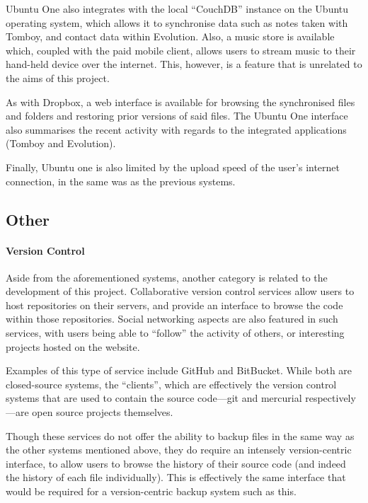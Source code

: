 \begin{bibunit}[plain]
Ubuntu One also integrates with the local ``CouchDB'' instance on the Ubuntu
operating system, which allows it to synchronise data such as notes taken with
Tomboy, and contact data within Evolution\cite{UbuntuOne-couchdb}. Also,
a music store is available which, coupled with the paid mobile client, allows
users to stream music to their hand-held device over the
internet\cite{UbuntuOne}. This, however, is a feature that is unrelated to the
aims of this project.

As with Dropbox, a web interface is available for browsing the synchronised
files and folders and restoring prior versions of said files. The Ubuntu One
interface also summarises the recent activity with regards to the integrated
applications (Tomboy and Evolution)\cite{UbuntuOne}.

Finally, Ubuntu one is also limited by the upload speed of the user's internet
connection, in the same was as the previous systems.

\subsection{Other}

\paragraph{Version Control}

Aside from the aforementioned systems, another category is related to the
development of this project. Collaborative version control services allow users
to host repositories on their servers, and provide an interface to browse the
code within those repositories. Social networking aspects are also featured in
such services, with users being able to ``follow'' the activity of others, or
interesting projects hosted on the website.

Examples of this type of service include GitHub\cite{Github} and
BitBucket\cite{Bitbucket}. While both are closed-source systems, the
``clients'', which are effectively the version control systems that are used to
contain the source code---git and mercurial respectively---are open source
projects themselves.

Though these services do not offer the ability to backup files in the same way
as the other systems mentioned above, they do require an intensely
version-centric interface, to allow users to browse the history of their source
code (and indeed the history of each file individually). This is effectively
the same interface that would be required for a version-centric backup system
such as this.


\end{bibunit}

